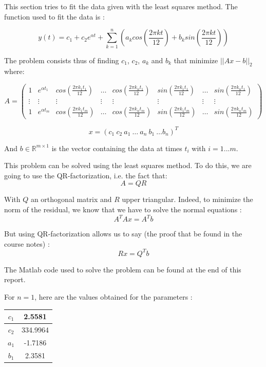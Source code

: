 This section tries to fit the data given with the least squares method. The function used to fit the data is :

$$y(t) = c_1 + c_2e^{\alpha t}+\sum_{k=1}^n (a_k cos(\frac{2\pi kt}{12}) + b_k sin(\frac{2\pi kt}{12}))$$

The problem consists thus of finding $c_1$, $c_2$, $a_k$ and $b_k$ that minimize $||Ax-b||_2$ where:

$$A = \left(\begin{array}{cccccccc}
1 & e^{\alpha t_1} & cos(\frac{2\pi k_1t_1}{12}) & \dots & cos(\frac{2\pi k_nt_1}{12}) & sin(\frac{2\pi k_1t_1}{12}) & \dots & sin(\frac{2\pi k_nt_1}{12}) \\ 
\vdots & \vdots & \vdots & \vdots & \vdots & \vdots & \vdots & \vdots \\ 
1 & e^{\alpha t_m} & cos(\frac{2\pi k_1t_m}{12})& \dots & cos(\frac{2\pi k_nt_m}{12}) & sin(\frac{2\pi k_1t_m}{12}) & \dots & sin(\frac{2\pi k_nt_m}{12})
\end{array} \right)$$

$$x=(c_1 \: c_2 \: a_1 \: \dots \: a_n \: b_1 \: \dots b_n)^T$$

And $b \in \mathbb{R}^{m\times 1}$ is the vector containing the data at times $t_i$ with $i=1...m$.

This problem can be solved using the least squares method. To do this, we are going to use the QR-factorization, i.e. the fact that:
$$A=QR$$

With $Q$ an orthogonal matrix and $R$ upper triangular. Indeed, to minimize the norm of the residual, we know that we have to solve the normal equations :
$$A^TAx=A^Tb$$

But using QR-factorization allows us to say (the proof that be found in the course notes) : 
$$Rx=Q^Tb$$

The Matlab code used to solve the problem can be found at the end of this report.

For $n=1$, here are the values obtained for the parameters :

\begin{center}
\begin{tabular}{|c|c|}
\hline 
$c_1$ & 2.5581 \\ 
\hline 
$c_2$ & 334.9964 \\ 
\hline 
$a_1$ & -1.7186 \\ 
\hline 
$b_1$ & 2.3581 \\ 
\hline 
\end{tabular} 
\end{center}

